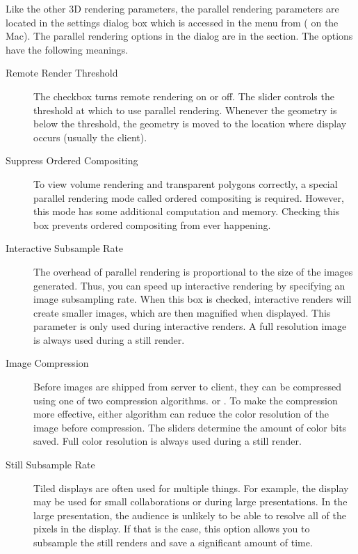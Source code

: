 Like the other 3D rendering parameters, the parallel rendering parameters
are located in the settings dialog box which is accessed in the menu from
 \ra {} ( \ra {} on the
Mac).  The parallel rendering options in the dialog are in the  \ra {} section.  The options have the following meanings.

\begin{description}
\item[Remote Render Threshold]  The checkbox
  turns remote rendering on or off.  The slider controls the threshold at
  which to use parallel rendering.  Whenever the geometry is below the
  threshold, the geometry is moved to the location where display occurs
  (usually the client).
\item[Suppress Ordered Compositing]  To view
  volume rendering and transparent polygons correctly, a special parallel
  rendering mode called ordered compositing is required.  However, this
  mode has some additional computation and memory.  Checking this box
  prevents ordered compositing from ever happening.
\item[Interactive Subsample Rate]  The overhead of parallel rendering
  is proportional to the size of the images generated.  Thus, you can speed
  up interactive rendering by specifying an image subsampling rate.  When
  this box is checked, interactive renders will create smaller images,
  which are then magnified when displayed.  This parameter is only used
  during interactive renders.  A full resolution image is always used
  during a still render.
\item[Image Compression] Before images are shipped from server to client,
  they can be compressed using one of two compression algorithms.
   or . To make the compression
  more effective, either algorithm can reduce the color resolution of
  the image before compression.  The sliders determine the amount of color
  bits saved.  Full color resolution is always used during a still render.
\item[Still Subsample Rate] Tiled displays are often used for multiple
  things.  For example, the display may be used for small collaborations or
  during large presentations.  In the large presentation, the audience is
  unlikely to be able to resolve all of the pixels in the display.  If that
  is the case, this option allows you to subsample the still renders and
  save a significant amount of time.

\end{description}
